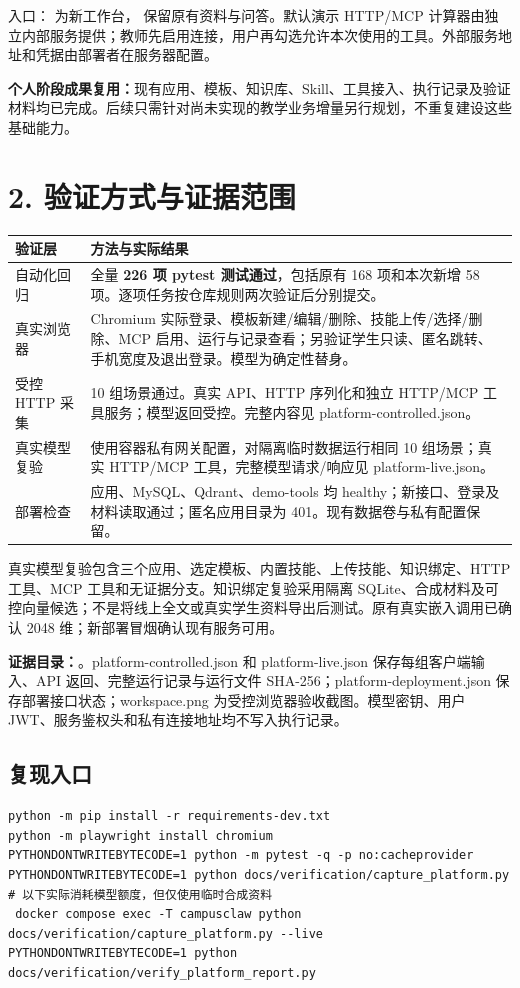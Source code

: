 \documentclass[UTF8,a4paper,10pt,fontset=fandol]{ctexart}
\newcommand{\code}[1]{\texttt{\detokenize{#1}}}
\begin{document}
入口：\code{/apps} 为新工作台，\code{/materials} 保留原有资料与问答。默认演示 HTTP/MCP 计算器由独立内部服务提供；教师先启用连接，用户再勾选允许本次使用的工具。外部服务地址和凭据由部署者在服务器配置。

\textbf{个人阶段成果复用：}现有应用、模板、知识库、Skill、工具接入、执行记录及验证材料均已完成。后续只需针对尚未实现的教学业务增量另行规划，不重复建设这些基础能力。

\newpage
\section*{2. 验证方式与证据范围}
\noindent\begin{tabularx}{\linewidth}{p{3.1cm}Y}
\toprule
验证层 & 方法与实际结果\\\midrule
自动化回归 & 全量 \textbf{226 项 pytest 测试通过}，包括原有 168 项和本次新增 58 项。逐项任务按仓库规则两次验证后分别提交。\\
真实浏览器 & Chromium 实际登录、模板新建/编辑/删除、技能上传/选择/删除、MCP 启用、运行与记录查看；另验证学生只读、匿名跳转、手机宽度及退出登录。模型为确定性替身。\\
受控 HTTP 采集 & 10 组场景通过。真实 API、HTTP 序列化和独立 HTTP/MCP 工具服务；模型返回受控。完整内容见 platform-controlled.json。\\
真实模型复验 & 使用容器私有网关配置，对隔离临时数据运行相同 10 组场景；真实 HTTP/MCP 工具，完整模型请求/响应见 platform-live.json。\\
部署检查 & 应用、MySQL、Qdrant、demo-tools 均 healthy；新接口、登录及材料读取通过；匿名应用目录为 401。现有数据卷与私有配置保留。\\\bottomrule
\end{tabularx}

真实模型复验包含三个应用、选定模板、内置技能、上传技能、知识绑定、HTTP 工具、MCP 工具和无证据分支。知识绑定复验采用隔离 SQLite、合成材料及可控向量候选；不是将线上全文或真实学生资料导出后测试。原有真实嵌入调用已确认 2048 维；新部署冒烟确认现有服务可用。

\textbf{证据目录：}。platform-controlled.json 和 platform-live.json 保存每组客户端输入、API 返回、完整运行记录与运行文件 SHA-256；platform-deployment.json 保存部署接口状态；workspace.png 为受控浏览器验收截图。模型密钥、用户 JWT、服务鉴权头和私有连接地址均不写入执行记录。

\subsection*{复现入口}
\begin{Verbatim}[frame=single]
python -m pip install -r requirements-dev.txt
python -m playwright install chromium
PYTHONDONTWRITEBYTECODE=1 python -m pytest -q -p no:cacheprovider
PYTHONDONTWRITEBYTECODE=1 python docs/verification/capture_platform.py
# 以下实际消耗模型额度，但仅使用临时合成资料
 docker compose exec -T campusclaw python docs/verification/capture_platform.py --live
PYTHONDONTWRITEBYTECODE=1 python docs/verification/verify_platform_report.py
\end{Verbatim}
\end{document}
